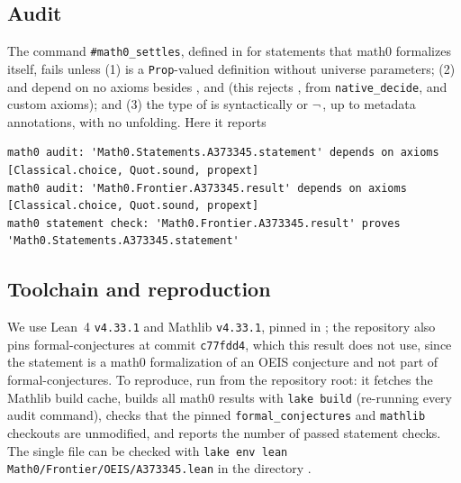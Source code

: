 \documentclass[11pt]{amsart}
\theoremstyle{plain}
\theoremstyle{definition}
\begin{document}
\subsection*{Audit}
The command \texttt{\#math0\_settles}, defined in  for statements that math0 formalizes itself, fails unless (1)  is a \texttt{Prop}-valued definition without universe parameters; (2)  and  depend on no axioms besides ,  and  (this rejects ,  from \texttt{native\_decide}, and custom axioms); and (3) the type of  is syntactically  or $\neg$\,, up to metadata annotations, with no unfolding. Here it reports
\begin{lstlisting}[basicstyle=\ttfamily\scriptsize]
math0 audit: 'Math0.Statements.A373345.statement' depends on axioms [Classical.choice, Quot.sound, propext]
math0 audit: 'Math0.Frontier.A373345.result' depends on axioms [Classical.choice, Quot.sound, propext]
math0 statement check: 'Math0.Frontier.A373345.result' proves 'Math0.Statements.A373345.statement'
\end{lstlisting}

\subsection*{Toolchain and reproduction}
We use Lean~4 \cite{Lean4} \texttt{v4.33.1} and Mathlib \cite{Mathlib} \texttt{v4.33.1}, pinned in ; the repository also pins formal-conjectures \cite{FC} at commit \texttt{c77fdd4}, which this result does not use, since the statement is a math0 formalization of an OEIS conjecture and not part of formal-conjectures.
To reproduce, run  from the repository root: it fetches the Mathlib build cache, builds all math0 results with \texttt{lake build} (re-running every audit command), checks that the pinned \texttt{formal\_conjectures} and \texttt{mathlib} checkouts are unmodified, and reports the number of passed statement checks. The single file can be checked with \texttt{lake env lean Math0/Frontier/OEIS/A373345.lean} in the directory .
\end{document}
